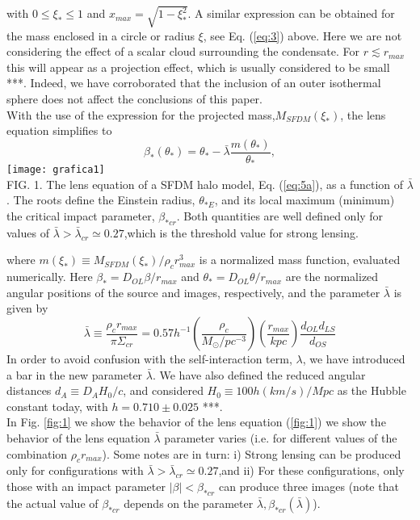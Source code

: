 \documentclass[10pt, letterpaper]{article}
\begin{document}
\begin{multicols}{2}
\begin{equation}
		\end{equation}
		with $0\leq\xi_*\leq1$ and $x_{max}=\sqrt{1-\xi_*^2}$.  A similar expression can be obtained for the mass enclosed in a circle or radius $\xi$, see Eq. (\ref{eq:3})  above. Here we are not considering the effect of a scalar cloud surrounding the condensate. For $r\lesssim r_{max}$ this will appear as a projection effect, which is usually considered to be small ***. Indeed, we have corroborated that the inclusion of an outer isothermal sphere does not affect the conclusions of this paper.\\
		With the use of the expression for the projected mass,$M_{SFDM}(\xi_*)$, the lens equation simplifies to
		\begin{equation} \tag{5a} \label{eq:5a}
			\beta_*(\theta_*)=\theta_*-\bar{\lambda}\frac{m(\theta_*)}{\theta_*},
		\end{equation}
		\texttt{[image: grafica1]}\label{fig:1}
		\\FIG. 1. The lens equation of a SFDM halo model, Eq. (\ref{eq:5a}), as a function of $\bar{\lambda}$.  The roots define the Einstein radius, $\theta_{*E}$, and its local maximum (minimum) the critical impact parameter, $\beta_{*cr}$. Both quantities are well defined only for values of $\bar{\lambda}>\bar{\lambda}_{cr}\simeq0.27$,which is the threshold value for strong lensing.\par
		where $m(\xi_*)\equiv M_{SFDM}(\xi_*)/\rho_cr_{max}^3$ is a normalized mass function, evaluated numerically. Here $\beta_*=D_{OL}\beta/r_{max}$ and $\theta_*=D_{OL}\theta/r_{max}$ are the normalized angular positions of the source and images, respectively, and the parameter $\bar{\lambda}$ is given by
		\begin{equation}\tag{5b}\label{eq:5b}
			\bar{\lambda}\equiv\frac{\rho_cr_{max}}{\pi\Sigma_{cr}}=0.57h^{-1} \left(\frac{\rho_c}{M_{\odot}/pc^{-3}}\right)\left(\frac{r_{max}}{kpc}\right) \frac{d_{OL}d_{LS}}{d_{OS}}
		\end{equation}
		In order to avoid confusion with the self-interaction term, $\lambda$, we have introduced a bar in the new parameter $\bar{\lambda}$. We have also defined the reduced angular distances $d_A\equiv D_A H_0/c$,  and considered $H_0\equiv100h(km/s)/Mpc$ as the Hubble constant today, with $h=0.710\pm0.025$ ***.\\
		In Fig. \ref{fig:1} we show the behavior of the lens equation (\ref{fig:1}) we show the behavior of the lens equation $\bar{\lambda}$ parameter varies (i.e. for different values of the combination $\rho_c r_{max}$). Some notes are in turn: i) Strong lensing can be produced only for configurations with $\bar{\lambda}>\bar{\lambda}_{cr}\simeq0.27$,and ii) For these configurations, only those with an impact parameter $|\beta|<\beta_{*cr}$ can produce three images (note that the actual value of $\beta_{*cr}$ depends on the parameter $\bar{\lambda}, \beta_{*cr}(\bar{\lambda})$).\\

\end{multicols}
\end{document}
